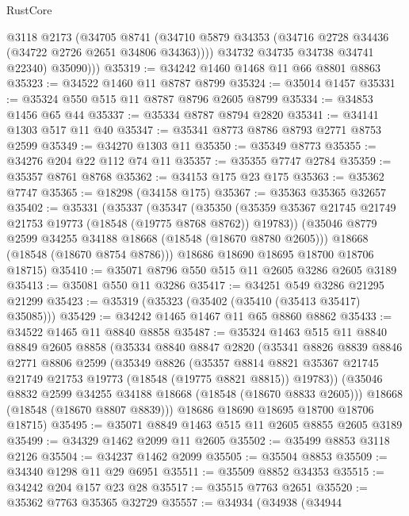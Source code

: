 \begin{lexlean}{RustCore}
\begin{coremodule}
            @3118
            @2173
            (@34705
              @8741
              (@34710 @5879 @34353 (@34716 @2728 @34436 (@34722 @2726 @2651 @34806 @34363))))
            @34732
            @34735
            @34738
            @34741
            @22340)
          @35090)))
@35319 := @34242 @1460 @1468 @11 @66 @8801 @8863
@35323 := @34522 @1460 @11 @8787 @8799
@35324 := @35014 @1457
@35331 := @35324 @550 @515 @11 @8787 @8796 @2605 @8799
@35334 := @34853 @1456 @65 @44
@35337 := @35334 @8787 @8794 @2820
@35341 := @34141 @1303 @517 @11 @40
@35347 := @35341 @8773 @8786 @8793 @2771 @8753 @2599
@35349 := @34270 @1303 @11
@35350 := @35349 @8773
@35355 := @34276 @204 @22 @112 @74 @11
@35357 := @35355 @7747 @2784
@35359 := @35357 @8761 @8768
@35362 := @34153 @175 @23 @175
@35363 := @35362 @7747
@35365 := @18298 (@34158 @175)
@35367 := @35363 @35365 @32657
@35402 := @35331
    (@35337
      (@35347
        (@35350 (@35359 @35367 @21745 @21749 @21753 @19773 (@18548 (@19775 @8768 @8762)) @19783))
        (@35046 @8779 @2599 @34255 @34188 @18668 (@18548 (@18670 @8780 @2605)))
        @18668
        (@18548 (@18670 @8754 @8786)))
      @18686
      @18690
      @18695
      @18700
      @18706
      @18715)
@35410 := @35071 @8796 @550 @515 @11 @2605 @3286 @2605 @3189
@35413 := @35081 @550 @11 @3286
@35417 := @34251 @549 @3286 @21295 @21299
@35423 := @35319 (@35323 (@35402 (@35410 (@35413 @35417) @35085)))
@35429 := @34242 @1465 @1467 @11 @65 @8860 @8862
@35433 := @34522 @1465 @11 @8840 @8858
@35487 := @35324
    @1463
    @515
    @11
    @8840
    @8849
    @2605
    @8858
    (@35334
      @8840
      @8847
      @2820
      (@35341
        @8826
        @8839
        @8846
        @2771
        @8806
        @2599
        (@35349
          @8826
          (@35357
            @8814
            @8821
            @35367
            @21745
            @21749
            @21753
            @19773
            (@18548 (@19775 @8821 @8815))
            @19783))
        (@35046 @8832 @2599 @34255 @34188 @18668 (@18548 (@18670 @8833 @2605)))
        @18668
        (@18548 (@18670 @8807 @8839)))
      @18686
      @18690
      @18695
      @18700
      @18706
      @18715)
@35495 := @35071 @8849 @1463 @515 @11 @2605 @8855 @2605 @3189
@35499 := @34329 @1462 @2099 @11 @2605
@35502 := @35499 @8853 @3118 @2126
@35504 := @34237 @1462 @2099
@35505 := @35504 @8853
@35509 := @34340 @1298 @11 @29 @6951
@35511 := @35509 @8852 @34353
@35515 := @34242 @204 @157 @23 @28
@35517 := @35515 @7763 @2651
@35520 := @35362 @7763 @35365 @32729
@35557 := @34934
    (@34938
      (@34944

\end{coremodule}
\end{lexlean}
